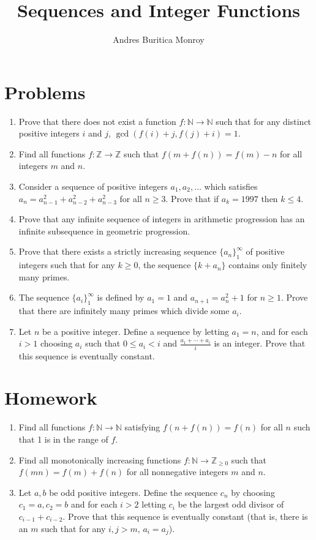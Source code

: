 \documentclass{article}
\title{Sequences and Integer Functions}
\author{Andres Buritica Monroy}
\date{}
\newcommand\Nn{\mathbb{N}}
\newcommand\Zz{\mathbb{Z}}
\begin{document}
\maketitle
\section{Problems}
\begin{enumerate}
  \item Prove that there does not exist a function $f:\Nn\to\Nn$
    such that for any distinct positive integers $i$ and $j$,
    $\gcd(f(i)+j,f(j)+i)=1$.
  \item Find all functions $f:\Zz\to\Zz$ such that $f(m+f(n))=f(m)-n$ for all
    integers $m$ and $n$.
  \item Consider a sequence of positive integers $a_1,a_2,\ldots$ which satisfies
    $a_n=a_{n-1}^2+a_{n-2}^2+a_{n-3}^2$ for all $n\ge 3$. Prove that if
    $a_k=1997$ then $k\le 4$.
  \item Prove that any infinite sequence of integers in arithmetic progression has an
    infinite subsequence in geometric progression.
  \item Prove that there exists a strictly increasing sequence $\{a_n\}_1^\infty$
    of positive integers such that for any $k\ge 0$, the sequence $\{k+a_n\}$
    contains only finitely many primes.
  \item The sequence $\{a_i\}_1^\infty$ is defined by $a_1 = 1$ and
    $a_{n+1}=a_n^2+1$ for $n\ge 1$. Prove that there are infinitely many primes
    which divide some $a_i$.
  \item Let $n$ be a positive integer. Define a sequence by letting $a_1=n$, and
    for each $i>1$ choosing $a_i$ such that $0\le a_i<i$ and
    $\frac{a_1+\cdots+a_i}i$ is an integer. Prove that this sequence is
    eventually constant.
\end{enumerate}
\newpage
\section{Homework}
\begin{enumerate}
  \item Find all functions $f:\Nn\to\Nn$ satisfying $f(n+f(n))=f(n)$ for all
    $n$ such that 1 is in the range of $f$.
  \item Find all monotonically increasing functions $f:\Nn\to\Zz_{\ge 0}$ such that $f(mn)=f(m)+f(n)$ for
    all nonnegative integers $m$ and $n$.
  \item Let $a,b$ be odd positive integers. Define the sequence $c_n$ by
    choosing $c_1=a,c_2=b$ and for each $i>2$ letting $c_i$ be the largest odd
    divisor of $c_{i-1}+c_{i-2}$. Prove that this sequence is eventually
    constant
    (that is, there is an $m$ such that for any $i,j>m$, $a_i=a_j$).
\end{enumerate}
\end{document}
